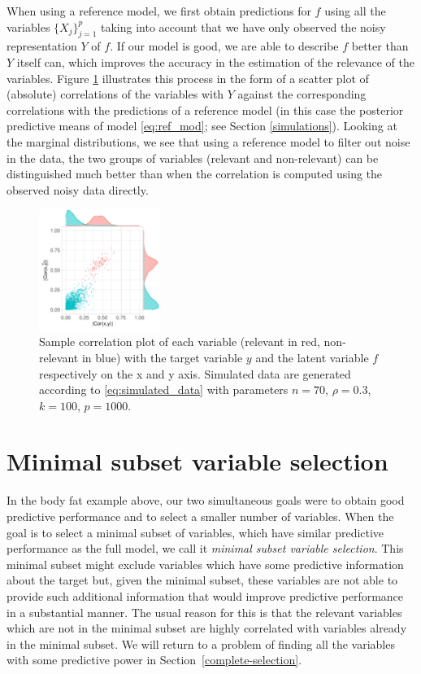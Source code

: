 \documentclass[a4]{article}
\theoremstyle{definition}
\begin{document}
When using a reference model, we first obtain predictions for $f$
using all the variables $\{X_{j}\}_{j=1}^{p}$ taking into account
that we have only observed the noisy representation $Y$ of $f$. If our
model is good, we are able to describe $f$ better than $Y$ itself can,
which improves the accuracy in the estimation of the relevance of the
variables.  Figure \ref{fig:correlation} illustrates this process in
the form of a scatter plot of (absolute) correlations of the
variables with $Y$ against the corresponding correlations with the
predictions of a reference model (in this case the posterior
predictive means of model \eqref{eq:ref_mod}; see Section
\ref{simulations}). Looking at the marginal distributions, we see
that using a reference model to filter out noise in the data, the two
groups of variables (relevant and non-relevant) can be distinguished
much better than when the correlation is computed using the observed
noisy data directly.
\begin{figure}[tp]
  \centering
  \vspace{-5mm}
  \includegraphics[width=0.35\textwidth]{graphics/correlation.pdf}
  \vspace{-0.5\baselineskip}
  \caption{Sample correlation plot of each variable (relevant in red, 
  non-relevant in blue) with the target variable $y$ and the latent variable 
  $f$ respectively on the x and y axis. Simulated data are generated according to 
  \eqref{eq:simulated_data} with parameters $n=70$, $\rho=0.3$,
  $k=100$, $p=1000$.}
  \label{fig:correlation}
\end{figure}

\hypertarget{comparison-minimal-subset}{
\section{Minimal subset variable selection}\label{comparison-minimal-subset}}

In the body fat example above, our two simultaneous goals were to 
obtain good predictive performance and to select a smaller number of variables. 
When the goal is to select a minimal subset of variables,
which have similar predictive performance as the full model, we call it
\emph{minimal subset variable selection}. This minimal subset might
exclude variables which have some predictive information about the
target but, given the minimal subset, these variables are not able to
provide such additional information that would improve predictive
performance in a substantial manner.
The usual reason for this is that the relevant variables
which are not in the minimal subset are highly correlated with variables already in
the minimal subset. We will return to a problem of finding all
the variables with some predictive power in Section~\ref{complete-selection}.
\end{document}
